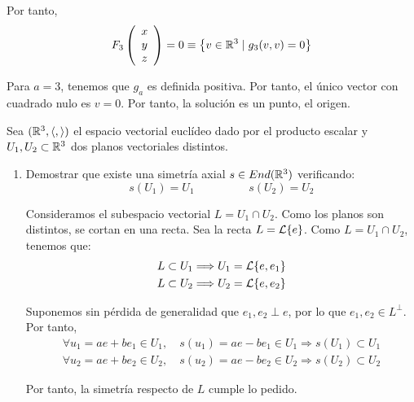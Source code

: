 \documentclass[12pt]{article}
\begin{document}
\begin{ejercicio}
\begin{enumerate}
        Por tanto,
        \begin{equation*}
            F_3\left(\begin{array}{c}
                        x \\ y \\ z
                    \end{array}\right)
            = 0 \equiv \left\{v\in \mathbb{R}^3 \mid g_3(v,v)=0\right\}
        \end{equation*}

        Para $a=3$, tenemos que $g_a$ es definida positiva. Por tanto, el único vector con cuadrado nulo es $v=0$. Por tanto, la solución es un punto, el origen.        
    \end{enumerate}
\end{ejercicio}


\begin{ejercicio}
    Sea $(\mathbb{R}^3, \langle,\rangle)$ el espacio vectorial euclídeo dado por el producto escalar y $U_1,U_2\subset \mathbb{R}^3$ dos planos vectoriales distintos.
    \begin{enumerate}
        \item Demostrar que existe una simetría axial $s\in End(\mathbb{R}^3)$ verificando:
        \begin{equation*}
            s(U_1)=U_1 \hspace{2cm} s(U_2)=U_2
        \end{equation*}

        Consideramos el subespacio vectorial $L=U_1\cap U_2$. Como los planos son distintos, se cortan en una recta. Sea la recta $L=\mathcal{L}\{e\}$. Como $L=U_1\cap U_2$, tenemos que:
        \begin{gather*}
            L\subset U_1 \Longrightarrow U_1=\mathcal{L}\{e, e_1\} \\
            L\subset U_2 \Longrightarrow U_2=\mathcal{L}\{e, e_2\}
        \end{gather*}

        Suponemos sin pérdida de generalidad que $e_1,e_2\perp e$, por lo que $e_1,e_2\in L^\perp$. Por tanto,
        \begin{gather*}
            \forall u_1=ae+be_1\in U_1,\quad s(u_1)=ae-be_1\in U_1 \Longrightarrow s(U_1)\subset U_1 \\
            \forall u_2=ae+be_2\in U_2,\quad s(u_2)=ae-be_2\in U_2 \Longrightarrow s(U_2)\subset U_2
        \end{gather*}

        Por tanto, la simetría respecto de $L$ cumple lo pedido.



\end{enumerate}
\end{ejercicio}
\end{document}
